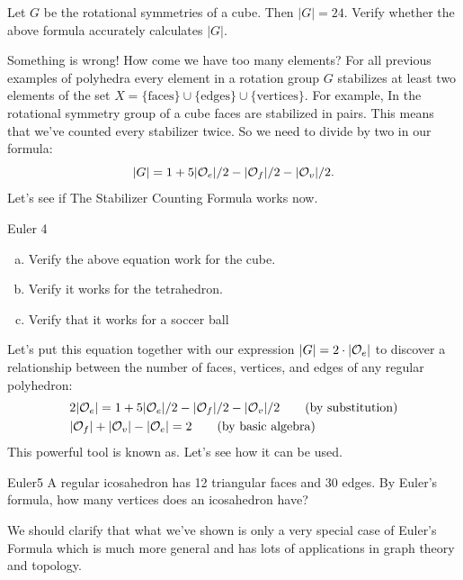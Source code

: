 \begin{exercise}\label{exercise:actions:Eulers2}
Let $G$ be the rotational symmetries of a cube.  Then $|G|=24$.  Verify whether the above formula accurately calculates $|G|$.
\end{exercise}
Something is wrong!  How come we have too many elements?
For all previous examples of polyhedra every element in a rotation group $G$ stabilizes at least two elements of the set $X=\{\text{faces}\}\cup\{\text{edges}\}\cup\{\text{vertices}\}$. For example, In the rotational symmetry group of a cube faces are stabilized in pairs.  This means that we've counted every stabilizer twice. So we need to divide by two in our formula: 
$$|G| = 1+ 5|{\cal O}_e|/2-|{\cal O}_f|/2 -|{\cal O}_v|/2 .$$
Let's see if The Stabilizer Counting Formula works now.

\begin {exercise}{Euler 4}
\begin{enumerate}[(a)]
\item Verify the above equation work for the cube.
\item Verify it works for the tetrahedron.
\item Verify that it works for a soccer ball
\end{enumerate}
\end {exercise}

Let's put this equation together with our expression $|G|=2\cdot |{\cal O}_e|$ to discover a relationship between the number of faces, vertices, and edges of any regular polyhedron:
\begin{align*}
& 2|{\cal O}_e|=1+5|{\cal O}_e|/2-|{\cal O}_f|/2-|{\cal O}_v|/2 \qquad \text{(by substitution)}\\
& |{\cal O}_f|+|{\cal O}_v|-|{\cal O}_e|=2 \qquad \text{(by basic algebra)}\\
\end {align*}
This powerful tool is known as.  Let's see how it can be used.

\begin {exercise}{Euler5}
A regular icosahedron has 12 triangular faces and 30 edges.  By Euler's formula, how many vertices does an icosahedron have?
\end {exercise}
We should clarify that what we've shown is only a very special case of Euler's Formula which is much more general and has lots of applications in graph theory and topology.  

